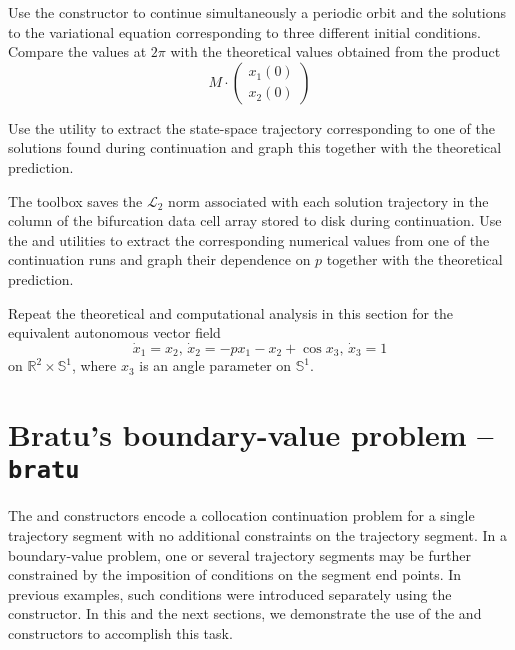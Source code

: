 \begin{exercises}
\item Use the  constructor to continue simultaneously a periodic orbit and the solutions to the variational equation corresponding to three different initial conditions. Compare the values at $2\pi$ with the theoretical values obtained from the product
\[
M\cdot\left(\begin{array}{c}x_1(0)\\x_2(0)\end{array}\right)
\]

\item Use the  utility to extract the state-space trajectory corresponding to one of the solutions found during continuation and graph this together with the theoretical prediction.

\item The  toolbox saves the $\mathcal{L}_2$ norm associated with each solution trajectory in the  column of the bifurcation data cell array stored to disk during continuation. Use the  and  utilities to extract the corresponding numerical values from one of the continuation runs and graph their dependence on $p$ together with the theoretical prediction.

\item Repeat the theoretical and computational analysis in this section for the equivalent autonomous vector field
\[
\dot{x}_1=x_2,\,\dot{x}_2=-px_1-x_2+\cos x_3,\,\dot{x}_3=1
\]
on $\mathbb{R}^2\times\mathbb{S}^1$, where $x_3$ is an angle parameter on $\mathbb{S}^1$.
\end{exercises}

\section{Bratu's boundary-value problem -- \texttt{bratu}}
The  and  constructors encode a collocation continuation problem for a single trajectory segment with no additional constraints on the trajectory segment. In a boundary-value problem, one or several trajectory segments may be further constrained by the imposition of conditions on the segment end points. In previous examples, such conditions were introduced separately using the  constructor. In this and the next sections, we demonstrate the use of the  and  constructors to accomplish this task.

